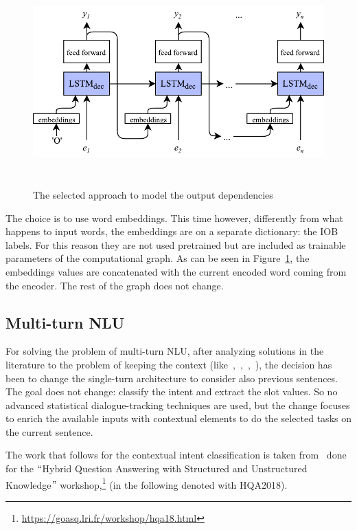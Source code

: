 \begin{figure}[!htbp]
    \centering
    \includegraphics[max width=\linewidth,max height=8cm,keepaspectratio]{figures/outputDependencies}
    \caption{The selected approach to model the output dependencies}\label{fig:outputDependencies}
\end{figure}

The choice is to use word embeddings. This time however, differently from what happens to input words, the embeddings are on a separate dictionary: the IOB labels. For this reason they are not used pretrained but are included as trainable parameters of the computational graph. As can be seen in Figure~\ref{fig:outputDependencies}, the embeddings values are concatenated with the current encoded word coming from the encoder. The rest of the graph does not change.

\subsection{Multi-turn NLU}
\label{approachMultiTurn}

For solving the problem of multi-turn NLU, after analyzing solutions in the literature to the problem of keeping the context (like~\cite{xu2014contextual},~\cite{bhargava2013easy},~\cite{shi2015contextual},~\cite{serban2016building}), the decision has been to change the single-turn architecture to consider also previous sentences. The goal does not change: classify the intent and extract the slot values. So no advanced statistical dialogue-tracking techniques are used, but the change focuses to enrich the available inputs with contextual elements to do the selected tasks on the current sentence.

The work that follows for the contextual intent classification is taken from~\cite{mensio2018multi} done for the $``$Hybrid Question Answering with Structured and Unstructured Knowledge$"$  workshop,\footnote{\url{https://goasq.lri.fr/workshop/hqa18.html}} (in the following denoted with HQA2018).


